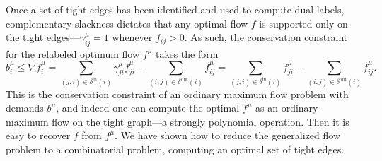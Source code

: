 \documentclass[11pt]{article}
\theoremstyle{definition}
\theoremstyle{definition}
\theoremstyle{definition}
\newcommand{\fu}{f^{\mu}}
\newcommand{\nfiu}{\nabla \fu_i}
\newcommand{\biu}{b_{i}^{\mu}}
\newcommand{\giij}{\gamma_{ij}^{\mu}}
\newcommand{\din}{\delta^{\text{in}}}
\newcommand{\dout}{\delta^{\text{out}}}
\begin{document}
	Once a set of tight edges has been identified and used to compute dual labels,
    complementary slackness dictates that any optimal flow $f$ is supported only on
    the tight edges---$\giij = 1$ 
    whenever $f_{ij} > 0$. As such, the conservation
    constraint for the relabeled optimum flow $f^\mu$ takes the form
    \[ \biu \leq \nfiu
    = \sum_{(j,i) \in \din(i)} \gamma_{ji}^{\mu} \fu_{ji} - \sum_{(i,j) \in \dout(i)} \fu_{ij}
    = \sum_{(j,i) \in \din(i)} \fu_{ji} - \sum_{(i,j) \in \dout(i)} \fu_{ij}. \]
    This is the conservation constraint of an ordinary maximum flow problem with demands
    $b^\mu$, and indeed one can compute the optimal $f^\mu$ as an
    ordinary maximum flow on the tight graph---a strongly polynomial operation.
    Then it is easy to recover $f$ from $f^\mu$. We have shown how to reduce the generalized
    flow problem to a combinatorial problem, computing an optimal set of tight edges.
    
\end{document}
